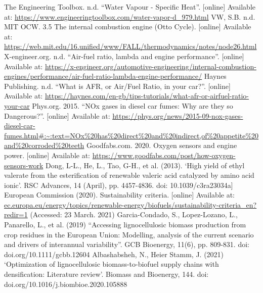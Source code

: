 \documentclass[11pt]{article}
\begin{document}
\begin{thebibliography}{00}
 The Engineering Toolbox. n.d. ``Water Vapour - Specific Heat''. [online] Available at: \url{https://www.engineeringtoolbox.com/water-vapor-d_979.html}
 VW, S.B. n.d. MIT OCW. 3.5 The internal combustion engine (Otto Cycle). [online] Available at: \url{https://web.mit.edu/16.unified/www/FALL/thermodynamics/notes/node26.html}
X-engineer.org. n.d. ``Air-fuel ratio, lambda and engine performance''. [online] Available at: \url{https://x-engineer.org/automotive-engineering/internal-combustion-engines/performance/air-fuel-ratio-lambda-engine-performance/}
 Haynes Publishing. n.d. ``What is AFR, or Air/Fuel Ratio, in your car?''. [online] Available at: \url{https://haynes.com/en-gb/tips-tutorials/what-afr-or-airfuel-ratio-your-car}
 Phys.org. 2015. ``NOx gases in diesel car fumes: Why are they so Dangerous?''. [online] Available at: \url{https://phys.org/news/2015-09-nox-gases-diesel-car-fumes.html#:~:text=NOx\%20has\%20direct\%20and\%20indirect,of\%20appetite\%20and\%20corroded\%20teeth} 
 Goodfabs.com. 2020. Oxygen sensors and engine power. [online] Available at: \url{https://www.goodfabs.com/post/how-oxygen-sensors-work}
 Dong, L-L., He, L., Tao, G-H., et al. (2013). ‘High yield of ethyl valerate from the esterification of renewable valeric acid catalyzed by amino acid ionic’. RSC Advances, 14 (April), pp. 4457-4836. doi: 10.1039/c3ra23034a]
 European Commission (2020).  Sustainability criteria. [online] Available at: \url{ec.europa.eu/energy/topics/renewable-energy/biofuels/sustainability-criteria_en?redir=1} (Accessed: 23 March. 2021)
 Garcia-Condado, S., Lopez-Lozano, L., Panarello, L., et al. (2019) ``Accessing lignocellulosic biomass production from crop residues in the European Union: Modelling, analysis of the current scenario and drivers of interannual variability''. GCB Bioenergy, 11(6), pp. 809-831. doi: doi.org/10.1111/gcbb.12604
 Albashabsheh, N., Heier Stamm, J. (2021) ‘Optimization of lignocellulosic biomass-to-biofuel supply chains with densification: Literature review’. Biomass and Bioenergy, 144. doi: doi.org/10.1016/j.biombioe.2020.105888
\end{thebibliography}
\end{document}
